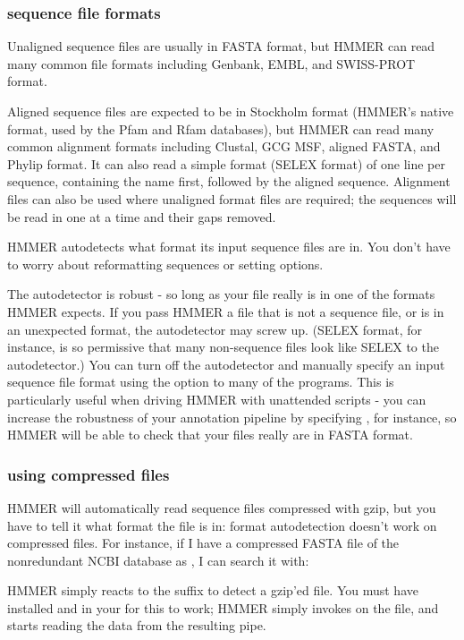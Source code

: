 \subsubsection{sequence file formats}

Unaligned sequence files are usually in FASTA format, but HMMER can
read many common file formats including Genbank, EMBL, and SWISS-PROT
format.

Aligned sequence files are expected to be in Stockholm format (HMMER's
native format, used by the Pfam and Rfam databases), but HMMER can
read many common alignment formats including Clustal, GCG MSF, aligned
FASTA, and Phylip format. It can also read a simple format (SELEX
format) of one line per sequence, containing the name first, followed
by the aligned sequence. Alignment files can also be used where
unaligned format files are required; the sequences will be read in one
at a time and their gaps removed.

HMMER autodetects what format its input sequence files are in. You
don't have to worry about reformatting sequences or setting options.

The autodetector is robust - so long as your file really is in one of
the formats HMMER expects. If you pass HMMER a file that is not a
sequence file, or is in an unexpected format, the autodetector may
screw up. (SELEX format, for instance, is so permissive that many
non-sequence files look like SELEX to the autodetector.) You can turn
off the autodetector and manually specify an input sequence file
format using the  option to many of the programs.
This is particularly useful when driving HMMER with unattended scripts
- you can increase the robustness of your annotation pipeline by
specifying , for instance, so HMMER will be
able to check that your files really are in FASTA format.

\subsubsection{using compressed files}

HMMER will automatically read sequence files compressed with gzip, but
you have to tell it what format the file is in: format autodetection
doesn't work on compressed files. For instance, if I have a compressed
FASTA file of the nonredundant NCBI database as , I can
search it with:


HMMER simply reacts to the  suffix to detect a gzip'ed file.
You must have  installed and in your  for this
to work; HMMER simply invokes  on the file, and starts
reading the data from the resulting pipe.

